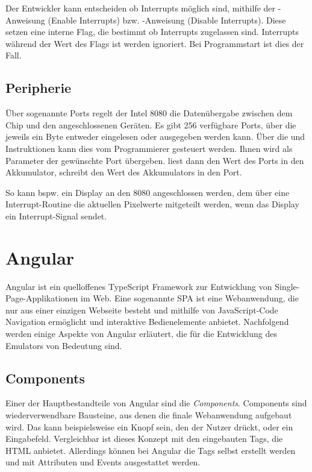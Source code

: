 Der Entwickler kann entscheiden ob Interrupts möglich sind, mithilfe der -Anweisung (Enable Interrupts) bzw. -Anweisung (Disable Interrupts). Diese setzen eine interne Flag, die bestimmt ob Interrupts zugelassen sind. Interrupts während der Wert des Flags  ist werden ignoriert. Bei Programmstart ist dies der Fall.

\subsection{Peripherie}

Über sogenannte Ports regelt der Intel 8080 die Datenübergabe zwischen dem Chip und den angeschlossenen Geräten. 
Es gibt 256 verfügbare Ports, über die jeweils ein Byte entweder eingelesen oder ausgegeben werden kann. Über die  und  Instruktionen kann dies vom Programmierer gesteuert werden. Ihnen wird als Parameter der gewünschte Port übergeben.  liest dann den Wert des Ports in den Akkumulator,  schreibt den Wert des Akkumulators in den Port.

So kann bspw. ein Display an den 8080 angeschlossen werden, dem über eine Interrupt-Routine die aktuellen Pixelwerte mitgeteilt werden, wenn das Display ein Interrupt-Signal sendet.

\section{Angular}

Angular ist ein quelloffenes TypeScript Framework zur Entwicklung von Single-Page-Applikationen im Web. Eine sogenannte SPA ist eine Webanwendung, die nur aus einer einzigen Webseite besteht und mithilfe von JavaScript-Code Navigation ermöglicht und interaktive Bedienelemente anbietet. Nachfolgend werden einige Aspekte von Angular erläutert, die für die Entwicklung des Emulators von Bedeutung sind.

\subsection{Components}

Einer der Hauptbestandteile von Angular sind die \textit{Components}. Components sind wiederverwendbare Bausteine, aus denen die finale Webanwendung aufgebaut wird. Das kann beispielsweise ein Knopf sein, den der Nutzer drückt, oder ein Eingabefeld. Vergleichbar ist dieses Konzept mit den eingebauten Tags, die HTML anbietet. Allerdings können bei Angular die Tags selbst erstellt werden und mit Attributen und Events ausgestattet werden.

